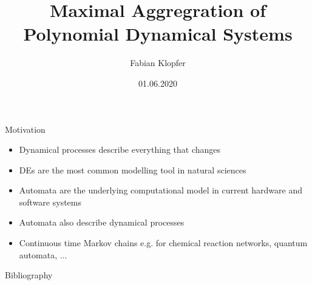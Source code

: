 \documentclass[rgb]{beamer}
\title{Maximal Aggregration of Polynomial Dynamical Systems}
\author{Fabian Klopfer}
\date{01.06.2020}
\institute{Modelling of Complex Self-Organizing Systems Group}
\begin{document}
    \begin{frame}
        \titlepage
    \end{frame}
    
        \begin{frame}{Motivation}
     \begin{itemize}
      \item Dynamical processes describe everything that changes
      \item DEs are the most common modelling tool in natural sciences
      \item Automata are the underlying computational model in current hardware and software systems
      \item Automata also describe dynamical processes
      \item Continuous time Markov chains e.g. for chemical reaction networks, quantum automata, $\dots$
     \end{itemize}
    \end{frame}
    

    
    \begin{frame}{Bibliography}
        \printbibliography
    \end{frame}
\end{document}
